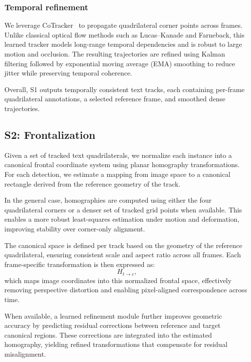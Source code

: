 \subsubsection{Temporal refinement}

We leverage CoTracker~\cite{cotracker} to propagate quadrilateral corner points across frames. Unlike classical optical flow methods such as Lucas--Kanade and Farneback, this learned tracker models long-range temporal dependencies and is robust to large motion and occlusion. The resulting trajectories are refined using Kalman filtering followed by exponential moving average (EMA) smoothing to reduce jitter while preserving temporal coherence.

Overall, S1 outputs temporally consistent text tracks, each containing per-frame quadrilateral annotations, a selected reference frame, and smoothed dense trajectories.

\subsection{S2: Frontalization}

Given a set of tracked text quadrilaterals, we normalize each instance into a canonical frontal coordinate system using planar homography transformations. For each detection, we estimate a mapping from image space to a canonical rectangle derived from the reference geometry of the track.

In the general case, homographies are computed using either the four quadrilateral corners or a denser set of tracked grid points when available. This enables a more robust least-squares estimation under motion and deformation, improving stability over corner-only alignment.

The canonical space is defined per track based on the geometry of the reference quadrilateral, ensuring consistent scale and aspect ratio across all frames. Each frame-specific transformation is then expressed as:
\[
H_{t \rightarrow c},
\]
which maps image coordinates into this normalized frontal space, effectively removing perspective distortion and enabling pixel-aligned correspondence across time.

When available, a learned refinement module further improves geometric accuracy by predicting residual corrections between reference and target canonical regions. These corrections are integrated into the estimated homography, yielding refined transformations that compensate for residual misalignment.

